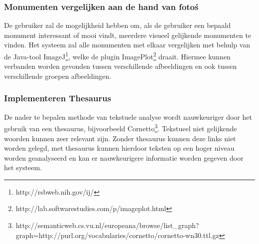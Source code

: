 \documentclass[a4paper,10pt]{article}
\begin{document}
			\subsubsection{Monumenten vergelijken aan de hand van foto\'s}
			De gebruiker zal de mogelijkheid hebben om, als de gebruiker een bepaald monument interessant of mooi vindt, meerdere visueel gelijkende monumenten te vinden. Het systeem zal alle monumenten met elkaar vergelijken met behulp van de Java-tool ImageJ\footnote{http://rsbweb.nih.gov/ij/}, welke de plugin ImagePlot\footnote{http://lab.softwarestudies.com/p/imageplot.html} draait. Hiermee kunnen verbanden worden gevonden tussen verschillende afbeeldingen en ook tussen verschillende groepen afbeeldingen.
				
			\subsubsection{Implementeren Thesaurus}
			De nader te bepalen methode van tekstuele analyse wordt nauwkeuriger door het gebruik van een thesaurus, bijvoorbeeld Cornetto\footnote{http://semanticweb.cs.vu.nl/europeana/browse/list\_graph?graph=http://purl.org/vocabularies/cornetto/cornetto-wn30.ttl.gz}. Tekstueel niet gelijkende woorden kunnen zeer relevant zijn. Zonder thesaurus kunnen deze links niet worden gelegd, met thesaurus kunnen hierdoor teksten op een hoger niveau worden geanalyseerd en kan er nauwkeurigere informatie worden gegeven door het systeem.
		
\end{document}
